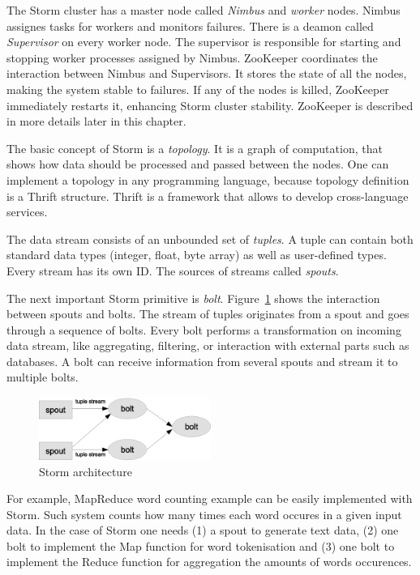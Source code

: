 The Storm cluster has a master node called \textit{Nimbus} and \textit{worker} nodes.
Nimbus assignes tasks for workers and monitors failures.
There is a deamon called \textit{Supervisor} on every worker node.
The supervisor is responsible for starting and stopping worker processes assigned by Nimbus.
ZooKeeper coordinates the interaction between Nimbus and Supervisors.
It stores the state of all the nodes, making the system stable to failures.
If any of the nodes is killed, ZooKeeper immediately restarts it, enhancing Storm cluster stability.
ZooKeeper is described in more details later in this chapter.

The basic concept of Storm is a \textit{topology}.
It is a graph of computation, that shows how data should be processed and passed between the nodes.
One can implement a topology in any programming language, because topology definition is a Thrift structure.
Thrift is a framework that allows to develop cross-language services.	

The data stream consists of an unbounded set of \textit{tuples}.
A tuple can contain both standard data types (integer, float, byte array) as well as user-defined types.
Every stream has its own ID.
The sources of streams called \textit{spouts}. 

The next important Storm primitive is \textit{bolt}.
Figure~\ref{fig:storm_architecture} shows the interaction between spouts and bolts.
The stream of tuples originates from a spout and goes through a sequence of bolts.
Every bolt performs a transformation on incoming data stream, like aggregating, filtering, or interaction with external parts such as databases.
A bolt can receive information from several spouts and stream it to multiple bolts.

\begin{figure}
  \centering
  \includegraphics [width=0.5\textwidth]{images/storm_architecture}
  \caption{Storm architecture}
  \label{fig:storm_architecture}
\end{figure}

For example, MapReduce word counting example can be easily implemented with Storm.
Such system counts how many times each word occures in a given input data.
In the case of Storm one needs 
(1) a spout to generate text data, 
(2) one bolt to implement the Map function for word tokenisation and 
(3) one bolt to implement the Reduce function for aggregation the amounts of words occurences. 

